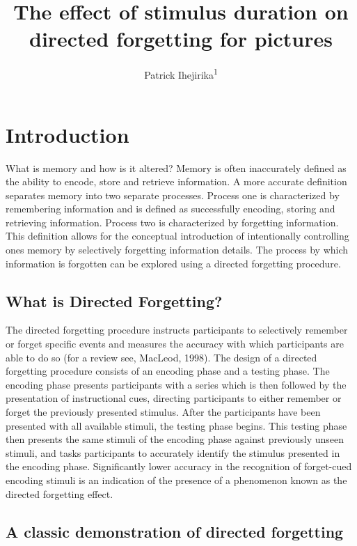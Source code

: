 \documentclass[
  man,floatsintext]{apa6}
\title{The effect of stimulus duration on directed forgetting for pictures}
\author{Patrick Ihejirika\textsuperscript{1}}
\date{}
\affiliation{\vspace{0.5cm}\textsuperscript{1} Brooklyn College of CUNY}
\begin{document}
\maketitle

\hypertarget{introduction}{%
\section{Introduction}\label{introduction}}

What is memory and how is it altered? Memory is often inaccurately defined as the ability to encode, store and retrieve information. A more accurate definition separates memory into two separate processes. Process one is characterized by remembering information and is defined as successfully encoding, storing and retrieving information. Process two is characterized by forgetting information. This definition allows for the conceptual introduction of intentionally controlling ones memory by selectively forgetting information details. The process by which information is forgotten can be explored using a directed forgetting procedure.

\hypertarget{what-is-directed-forgetting}{%
\subsection{What is Directed Forgetting?}\label{what-is-directed-forgetting}}

The directed forgetting procedure instructs participants to selectively remember or forget specific events and measures the accuracy with which participants are able to do so (for a review see, MacLeod, 1998). The design of a directed forgetting procedure consists of an encoding phase and a testing phase. The encoding phase presents participants with a series which is then followed by the presentation of instructional cues, directing participants to either remember or forget the previously presented stimulus. After the participants have been presented with all available stimuli, the testing phase begins. This testing phase then presents the same stimuli of the encoding phase against previously unseen stimuli, and tasks participants to accurately identify the stimulus presented in the encoding phase. Significantly lower accuracy in the recognition of forget-cued encoding stimuli is an indication of the presence of a phenomenon known as the directed forgetting effect.

\hypertarget{a-classic-demonstration-of-directed-forgetting}{%
\subsection{A classic demonstration of directed forgetting}\label{a-classic-demonstration-of-directed-forgetting}}
\end{document}

